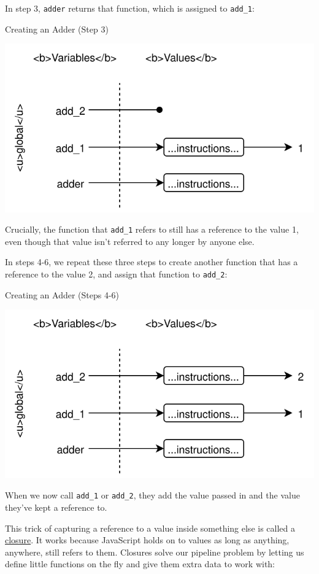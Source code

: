 In step 3, \texttt{adder} returns that function, which is assigned to
\texttt{add\_1}:

Creating an Adder (Step 3)

\includegraphics{../../files/callbacks-adder-3.svg}

Crucially, the function that \texttt{add\_1} refers to still has a
reference to the value 1, even though that value isn't referred to any
longer by anyone else.

In steps 4-6, we repeat these three steps to create another function
that has a reference to the value 2, and assign that function to
\texttt{add\_2}:

Creating an Adder (Steps 4-6)

\includegraphics{../../files/callbacks-adder-4.svg}

When we now call \texttt{add\_1} or \texttt{add\_2}, they add the value
passed in and the value they've kept a reference to.

This trick of capturing a reference to a value inside something else is
called a \protect\hyperlink{g:closure}{closure}. It works because
JavaScript holds on to values as long as anything, anywhere, still
refers to them. Closures solve our pipeline problem by letting us define
little functions on the fly and give them extra data to work with:

